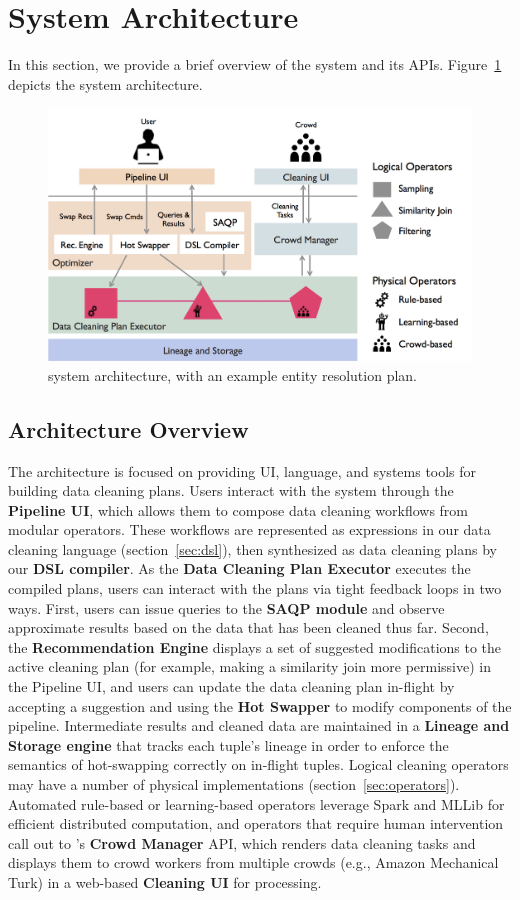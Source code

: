 \section{System Architecture}

In this section, we provide a brief overview of the \sys system and its APIs.
Figure~\ref{fig:arch} depicts the system architecture.

\begin{figure}[t]
\centering
\includegraphics[width = .5\textwidth]{figs/architecture.png}
\caption{\sys system architecture, with an example entity resolution plan.}
\label{fig:arch}
\end{figure}

\subsection{Architecture Overview}
The \sys architecture is focused on providing UI, language, and systems tools for building data cleaning plans.
Users interact with the system through the \textbf{Pipeline UI}, which allows them to compose data cleaning workflows from modular operators.
These workflows are represented as expressions in our data cleaning language (section~\ref{sec:dsl}), then synthesized as data cleaning plans by our \textbf{DSL compiler}.
As the \textbf{Data Cleaning Plan Executor} executes the compiled plans, users can interact with the plans via tight feedback loops in two ways.
First, users can issue queries to the \textbf{SAQP module} and observe approximate results based on the data that has been cleaned thus far.
Second, the \textbf{Recommendation Engine} displays a set of suggested modifications to the active cleaning plan (for example, making a similarity join more permissive) in the Pipeline UI, and users can update the data cleaning plan in-flight by accepting a suggestion and using the \textbf{Hot Swapper} to modify components of the pipeline.
Intermediate results and cleaned data are maintained in a \textbf{Lineage and Storage engine} that tracks each tuple's lineage in order to enforce the semantics of hot-swapping correctly on in-flight tuples.
Logical cleaning operators may have a number of physical implementations (section~\ref{sec:operators}).
Automated rule-based or learning-based operators leverage Spark and MLLib for efficient distributed computation, and operators that require human intervention call out to \sys's \textbf{Crowd Manager} API, which renders data cleaning tasks and displays them to crowd workers from multiple crowds (e.g., Amazon Mechanical Turk) in a web-based \textbf{Cleaning UI} for processing.

